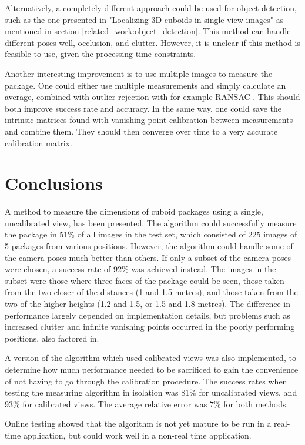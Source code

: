 Alternatively, a completely different approach could be used for object detection, such as the one presented in "Localizing 3D cuboids in single-view images" as mentioned in section \ref{related_work:object_detection}.
This method can handle different poses well, occlusion, and clutter.
However, it is unclear if this method is feasible to use, given the processing time constraints.

Another interesting improvement is to use multiple images to measure the package.
One could either use multiple measurements and simply calculate an average, combined with outlier rejection with for example RANSAC \cite{fischler1981random}.
This should both improve success rate and accuracy.
In the same way, one could save the intrinsic matrices found with vanishing point calibration between measurements and combine them.
They should then converge over time to a very accurate calibration matrix. 


\section{Conclusions}
A method to measure the dimensions of cuboid packages using a single, uncalibrated view, has been presented.
The algorithm could successfully measure the package in $51\%$ of all images in the test set, which consisted of 225 images of 5 packages from various positions.
However, the algorithm could handle some of the camera poses much better than others.
If only a subset of the camera poses were chosen, a success rate of $92\%$ was achieved instead.
The images in the subset were those where three faces of the package could be seen, those taken from the two closer of the distances (1 and 1.5 metres), and those taken from the two of the higher heights (1.2 and 1.5, or 1.5 and 1.8 metres).
The difference in performance largely depended on implementation details, but problems such as increased clutter and infinite vanishing points occurred in the poorly performing positions, also factored in.

A version of the algorithm which used calibrated views was also implemented, to determine how much performance needed to be sacrificed to gain the convenience of not having to go through the calibration procedure.
The success rates when testing the measuring algorithm in isolation was $81\%$ for uncalibrated views, and $93\%$ for calibrated views.
The average relative error was $7\%$ for both methods.

Online testing showed that the algorithm is not yet mature to be run in a real-time application, but could work well in a non-real time application.






